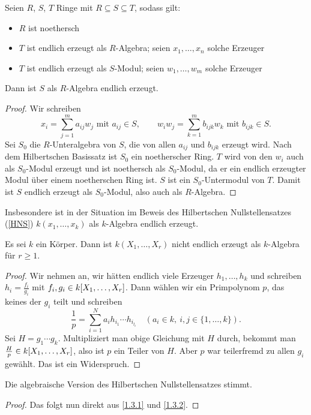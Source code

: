 \documentclass[a4paper,12pt]{scrbook}
\newtheorem{proof}{Beweis}
\newcommand{\polyx}[1][n]{\ensuremath%
  [X_{1},\dotsc,X_{#1}]}
\begin{document}
\begin{lem}\label{1.3.1}
  Seien $R$, $S$, $T$ Ringe mit $R\subseteq S\subseteq T$, sodass gilt:
  \begin{itemize}
  \item $R$ ist noethersch
  \item $T$ ist endlich erzeugt als $R$-Algebra; seien $x_1,\dotsc,x_n$ solche Erzeuger
  \item $T$ ist endlich erzeugt als $S$-Modul; seien $w_1,\dotsc,w_m$ solche Erzeuger
  \end{itemize}
  Dann ist $S$ als $R$-Algebra endlich erzeugt.
\end{lem}
\begin{proof}
  Wir schreiben 
  \[ x_i=\displaystyle\sum_{j=1}^m a_{ij}w_j \text{ mit } a_{ij}\in S, \qquad
     w_iw_j=\displaystyle\sum_{k=1}^m b_{ijk}w_k \text { mit } b_{ijk}\in S. \]
  Sei $S_0$ die $R$-Unteralgebra von $S$, die von allen $a_{ij}$ und $b_{ijk}$ erzeugt wird. Nach dem Hilbertschen Basissatz ist
  $S_0$ ein noetherscher Ring. $T$ wird von den $w_i$ auch als $S_0$-Modul erzeugt und ist noethersch als $S_0$-Modul, da er ein
  endlich erzeugter Modul über einem noetherschen Ring ist. $S$ ist ein $S_0$-Untermodul von $T$. Damit ist $S$ endlich erzeugt
  als $S_0$-Modul, also auch als $R$-Algebra.
\end{proof}

Insbesondere ist in der Situation im Beweis des Hilbertschen Nullstellensatzes (\cref{HNS}) $k(x_1,\dotsc,x_k)$ als
$k$-Algebra endlich erzeugt.

\begin{lem}\label{1.3.2}
  Es sei $k$ ein Körper. Dann ist $k(X_1,\dotsc,X_r)$ nicht endlich erzeugt als $k$-Algebra für $r\ge1$.
\end{lem}
\begin{proof}
  Wir nehmen an, wir hätten endlich viele Erzeuger $h_1,\dotsc,h_k$ und schreiben $h_i=\frac{f_i}{g_i}$ mit $f_i,g_i\in
  k\polyx[r]$. Dann wählen wir ein Primpolynom $p$, das keines der $g_i$ teilt und schreiben
  \[ \frac1p = \sum_{i=1}^N a_i h_{i_1}\dotsm h_{i_{l_i}} \quad (a_i\in k,\ i,j\in\{1,\dotsc,k\}). \]
  Sei $H=g_1\dotsm g_k$. Multipliziert man obige Gleichung mit $H$ durch, bekommt man $\frac{H}{p}\in k\polyx[r]$, also
  ist $p$ ein Teiler von $H$. Aber $p$ war teilerfremd zu allen $g_i$ gewählt. Das ist ein Widerspruch.
\end{proof}

\begin{prop}\label{1.3.3}
  Die algebraische Version des Hilbertschen Nullstellensatzes stimmt.
\end{prop}
\begin{proof}
  Das folgt nun direkt aus \cref{1.3.1} und \cref{1.3.2}.
\end{proof}
\end{document}
